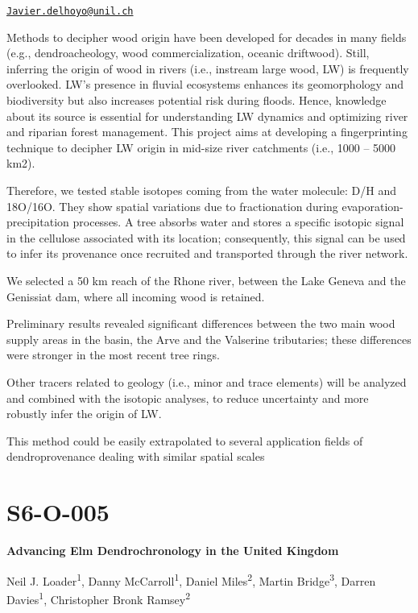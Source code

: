 \documentclass[
]{book}
\begin{document}
\href{mailto:Javier.delhoyo@unil.ch}{\nolinkurl{Javier.delhoyo@unil.ch}}

Methods to decipher wood origin have been developed for decades in many fields (e.g., dendroacheology, wood commercialization, oceanic driftwood). Still, inferring the origin of wood in rivers (i.e., instream large wood, LW) is frequently overlooked. LW's presence in fluvial ecosystems enhances its geomorphology and biodiversity but also increases potential risk during floods. Hence, knowledge about its source is essential for understanding LW dynamics and optimizing river and riparian forest management. This project aims at developing a fingerprinting technique to decipher LW origin in mid-size river catchments (i.e., 1000 -- 5000 km2).

Therefore, we tested stable isotopes coming from the water molecule: D/H and 18O/16O. They show spatial variations due to fractionation during evaporation-precipitation processes. A tree absorbs water and stores a specific isotopic signal in the cellulose associated with its location; consequently, this signal can be used to infer its provenance once recruited and transported through the river network.

We selected a 50 km reach of the Rhone river, between the Lake Geneva and the Genissiat dam, where all incoming wood is retained.

Preliminary results revealed significant differences between the two main wood supply areas in the basin, the Arve and the Valserine tributaries; these differences were stronger in the most recent tree rings.

Other tracers related to geology (i.e., minor and trace elements) will be analyzed and combined with the isotopic analyses, to reduce uncertainty and more robustly infer the origin of LW.

This method could be easily extrapolated to several application fields of dendroprovenance dealing with similar spatial scales

\hypertarget{s6-o-005}{%
\section*{S6-O-005}\label{s6-o-005}}

\textbf{Advancing Elm Dendrochronology in the United Kingdom}

Neil J. Loader\textsuperscript{1}, Danny McCarroll\textsuperscript{1}, Daniel Miles\textsuperscript{2}, Martin Bridge\textsuperscript{3}, Darren Davies\textsuperscript{1}, Christopher Bronk Ramsey\textsuperscript{2}
\end{document}

